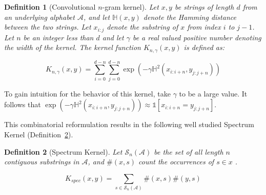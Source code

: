 \documentclass{article}
\newtheorem{definition}{Definition}
\begin{document}
\begin{definition}[Convolutional $n$-gram kernel]
Let $x,y$ be strings of length $d$ from an underlying alphabet $\mathcal{A}$, and let $\mathds{H}(x,y)$ denote the Hamming distance between the two strings. Let $x_{i:j}$ denote the substring of $x$ from index $i$ to $j - 1$. Let $n$ be an integer less than $d$ and let $\gamma$ be a real valued positive number denoting the width of the kernel. The kernel function $K_{n,\gamma}(x, y)$ is defined as:

\vspace{-0.4cm}
\begin{equation}
K_{n,\gamma}(x, y) = \displaystyle\sum_{i=0}^{d - n} \displaystyle\sum_{j=0}^{d - n}
\exp(-\gamma \mathds{H}^{2}(x_{i:i+n}, y_{j:j+n}))
\label{eq:convkernel}
\end{equation}
\end{definition}

To gain intuition for the behavior of this kernel, take $\gamma$ to be a large value. It follows that
$\exp(-\gamma \mathds{H}^{2}(x_{i:i+n}, y_{j:j+n})) \approx \mathds{1}[x_{i:i+n} = y_{j:j+n}]$.


This combinatorial reformulation results in the following well studied Spectrum Kernel (Definition~\ref{def:spectrum}).

\begin{definition}[Spectrum Kernel]
\label{def:spectrum}
Let $\mathcal{S}_{n}(\mathcal{A})$ be the set of all length $n$ contiguous substrings in $\mathcal{A}$, and $\#(x,s)$ count the occurrences of $s \in x$ \cite{leslie2002spectrum}.

\vspace{-0.4cm}
\begin{equation}
K_{spec}(x, y) = \displaystyle\sum_{s \in \mathcal{S}_n(\mathcal{A})} \#(x,s)\#(y,s)
\label{eq:spectrum}
\end{equation}
\end{definition}
\end{document}
